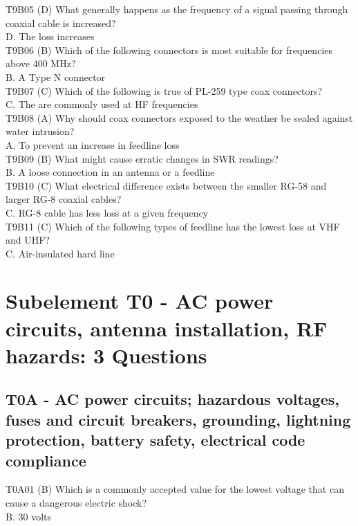\documentclass[12pt,letterpaper]{report}
\begin{document}
T9B05 (D) What generally happens as the frequency of a signal passing through coaxial cable is increased?\\
D. The loss increases\\

T9B06 (B) Which of the following connectors is most suitable for frequencies above 400 MHz?\\
B. A Type N connector\\

T9B07 (C) Which of the following is true of PL-259 type coax connectors?\\
C. The are commonly used at HF frequencies\\

T9B08 (A) Why should coax connectors exposed to the weather be sealed against water intrusion?\\
A. To prevent an increase in feedline loss\\

T9B09 (B) What might cause erratic changes in SWR readings?\\
B. A loose connection in an antenna or a feedline\\

T9B10 (C) What electrical difference exists between the smaller RG-58 and larger RG-8 coaxial cables?\\
C. RG-8 cable has less loss at a given frequency\\

T9B11 (C) Which of the following types of feedline has the lowest loss at VHF and UHF?\\
C. Air-insulated hard line\\

\chapter{Subelement T0 - AC power circuits, antenna installation, RF hazards: 3 Questions}

\section{T0A - AC power circuits; hazardous voltages, fuses and circuit breakers, grounding, lightning protection, battery safety, electrical code compliance}

T0A01 (B) Which is a commonly accepted value for the lowest voltage that can cause a dangerous electric shock?\\
B. 30 volts\\
\end{document}
